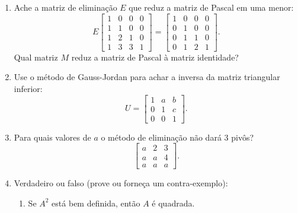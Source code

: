 \documentclass[leqno]{article}
\begin{document}
\begin{enumerate}

\item Ache a matriz de eliminação $E$ que reduz a matriz de Pascal em uma menor:
$$E \begin{bmatrix} 1 & 0 & 0 & 0 \\
1 & 1 & 0 & 0 \\
1 & 2 & 1 & 0 \\
1 & 3 & 3 & 1
\end{bmatrix} = \begin{bmatrix} 1 & 0 & 0 & 0 \\
0 & 1 & 0 & 0 \\
0 & 1 & 1 & 0 \\
0 & 1 & 2 & 1 
\end{bmatrix}.$$
Qual matriz $M$ reduz a matriz de Pascal à matriz identidade?

\begin{sol} 
\end{sol} 

\item Use o método de Gauss-Jordan para achar a inversa da matriz triangular inferior:
$$U = \begin{bmatrix} 1 & a & b  \\
0 & 1 & c  \\
0 & 0 & 1 
\end{bmatrix}.$$

\begin{sol} 
\end{sol} 

\item Para quais valores de $a$ o método de eliminação não dará 3 pivôs?
$$\begin{bmatrix} 
a & 2 & 3  \\
a & a & 4  \\
a & a & a 
\end{bmatrix}.$$

\begin{sol} 
\end{sol} 

\item Verdadeiro ou falso (prove ou forneça um contra-exemplo):

\begin{enumerate}

\item Se $A^2$ está bem definida, então $A$ é quadrada.


\end{enumerate}
\end{enumerate}
\end{document}

